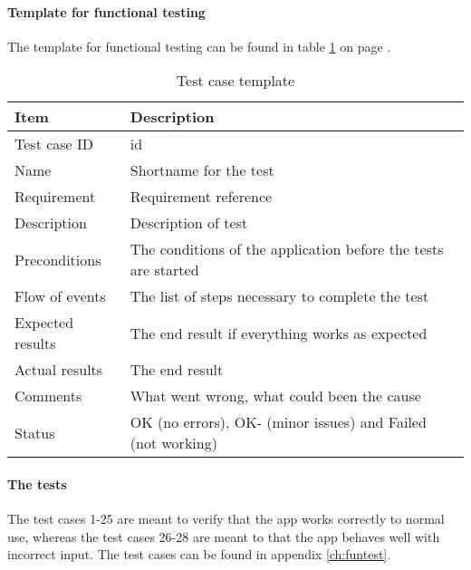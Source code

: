 			\paragraph{Template for functional testing}\hfill
\newline		
			The template for functional testing can be found in table \ref{tab:casetemp1} on page \pageref{tab:casetemp1}.	
				\begin{table}[h!]
\begin{center}
					\begin{tabular}{l|p{10cm}}\hline
\textbf{Item} & \textbf{Description} \\ \hline \hline
						Test case ID & id \\ \hline
						Name & Shortname for the test\\ \hline
						Requirement & Requirement reference\\ \hline
						Description & Description of test\\ \hline
						Preconditions & The conditions of the application before the tests are started\\ \hline
						Flow of events & The list of steps necessary to complete the test \\ \hline
						Expected results & The end result if everything works as expected\\ \hline 
						Actual results & The end result\\ \hline
						Comments & What went wrong, what could been the cause\\ \hline
						Status &OK (no errors), OK- (minor issues) and Failed (not working)\\ \hline
					\end{tabular}
\end{center}
				\caption{Test case template} \label{tab:casetemp1}
			\end{table}
			\paragraph{The tests}\hfill
\newline
				The test cases 1-25 are meant to verify that the app works correctly to normal use, whereas the test cases 26-28 are meant to that the app behaves well with incorrect input. The test cases can be found in appendix \ref{ch:funtest}.
